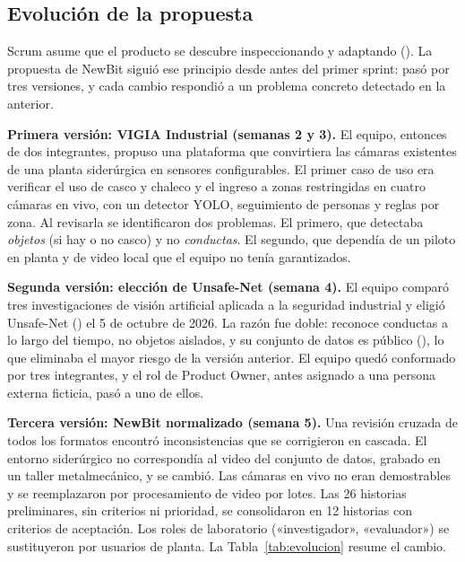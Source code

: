 \documentclass[12pt,a4paper]{article}
\makeatletter
\newcommand{\cita@revisar}[1]{\ifcsdef{ca@#1}{}{\PackageError{citas}{Cita no definida: #1}{}}}
\newcommand{\cita@par}[1]{\cita@revisar{#1}\cita@sep\csuse{ca@#1}, \csuse{cy@#1}\def\cita@sep{; }}
\newcommand{\parencite}[1]{(\def\cita@sep{}\forcsvlist{\cita@par}{#1})}
\makeatother
\begin{document}
\FloatBarrier
\subsection{Evolución de la propuesta}

Scrum asume que el producto se descubre inspeccionando y adaptando \parencite{sbok}. La propuesta de NewBit siguió ese principio desde antes del primer sprint: pasó por tres versiones, y cada cambio respondió a un problema concreto detectado en la anterior.

\textbf{Primera versión: VIGIA Industrial (semanas 2 y 3).} El equipo, entonces de dos integrantes, propuso una plataforma que convirtiera las cámaras existentes de una planta siderúrgica en sensores configurables. El primer caso de uso era verificar el uso de casco y chaleco y el ingreso a zonas restringidas en cuatro cámaras en vivo, con un detector YOLO, seguimiento de personas y reglas por zona. Al revisarla se identificaron dos problemas. El primero, que detectaba \textit{objetos} (si hay o no casco) y no \textit{conductas}. El segundo, que dependía de un piloto en planta y de video local que el equipo no tenía garantizados.

\textbf{Segunda versión: elección de Unsafe-Net (semana 4).} El equipo comparó tres investigaciones de visión artificial aplicada a la seguridad industrial y eligió Unsafe-Net \parencite{onal2025} el 5 de octubre de 2026. La razón fue doble: reconoce conductas a lo largo del tiempo, no objetos aislados, y su conjunto de datos es público \parencite{onal2024dataset}, lo que eliminaba el mayor riesgo de la versión anterior. El equipo quedó conformado por tres integrantes, y el rol de Product Owner, antes asignado a una persona externa ficticia, pasó a uno de ellos.

\textbf{Tercera versión: NewBit normalizado (semana 5).} Una revisión cruzada de todos los formatos encontró inconsistencias que se corrigieron en cascada. El entorno siderúrgico no correspondía al video del conjunto de datos, grabado en un taller metalmecánico, y se cambió. Las cámaras en vivo no eran demostrables y se reemplazaron por procesamiento de video por lotes. Las 26 historias preliminares, sin criterios ni prioridad, se consolidaron en 12 historias con criterios de aceptación. Los roles de laboratorio («investigador», «evaluador») se sustituyeron por usuarios de planta. La Tabla~\ref{tab:evolucion} resume el cambio.
\end{document}
